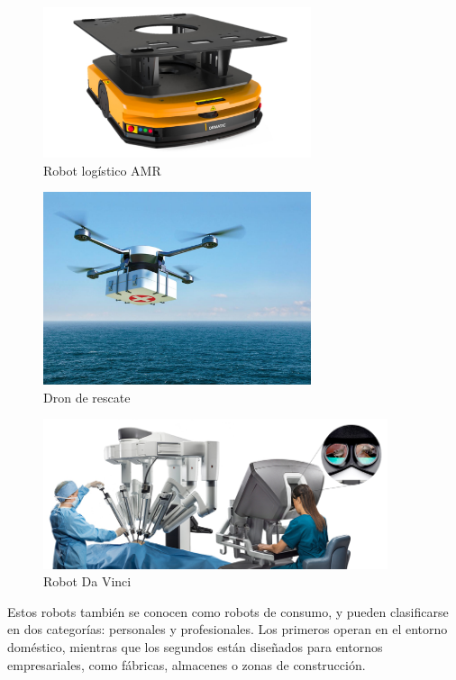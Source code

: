 \begin{figure}[H]
    \centering
    \includegraphics[width=0.7\textwidth]{figures/cap_1/amr.jpg}
    \caption{Robot logístico AMR}
    \label{fig:amr}
\end{figure}

\begin{figure}[H]
    \centering
    \includegraphics[width=0.7\textwidth]{figures/cap_1/dron.jpg}
    \caption{Dron de rescate}
    \label{fig:dron}
\end{figure}

\begin{figure}[H]
    \centering
    \includegraphics[width=0.9\textwidth]{figures/cap_1/davinci.jpg}
    \caption{Robot Da Vinci}
    \label{fig:davinci}
\end{figure}

Estos robots también se conocen como robots de consumo, y pueden clasificarse en dos categorías: personales y profesionales. Los primeros operan en el entorno doméstico, mientras que los segundos están diseñados para entornos empresariales, como fábricas, almacenes o zonas de construcción.

